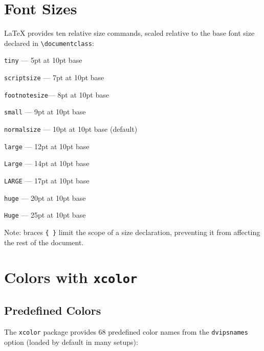 \documentclass[12pt,a4paper]{article}
\begin{document}

\section{Font Sizes}
\label{sec:sizes}

\LaTeX{} provides ten relative size commands, scaled relative to the
base font size declared in \verb|\documentclass|:

\medskip
{\tiny        \texttt{tiny}        — 5pt at 10pt base}

{\scriptsize  \texttt{scriptsize}  — 7pt at 10pt base}

{\footnotesize\texttt{footnotesize}— 8pt at 10pt base}

{\small       \texttt{small}       — 9pt at 10pt base}

{\normalsize  \texttt{normalsize}  — 10pt at 10pt base (default)}

{\large       \texttt{large}       — 12pt at 10pt base}

{\Large       \texttt{Large}       — 14pt at 10pt base}

{\LARGE       \texttt{LARGE}       — 17pt at 10pt base}

{\huge        \texttt{huge}        — 20pt at 10pt base}

{\Huge        \texttt{Huge}        — 25pt at 10pt base}

\medskip
\noindent
Note: braces \verb|{ }| limit the scope of a size declaration, preventing
it from affecting the rest of the document.


\section{Colors with \texttt{xcolor}}
\label{sec:colors}

\subsection{Predefined Colors}

The \texttt{xcolor} package provides 68 predefined color names from the
\texttt{dvipsnames} option (loaded by default in many setups):
\end{document}
